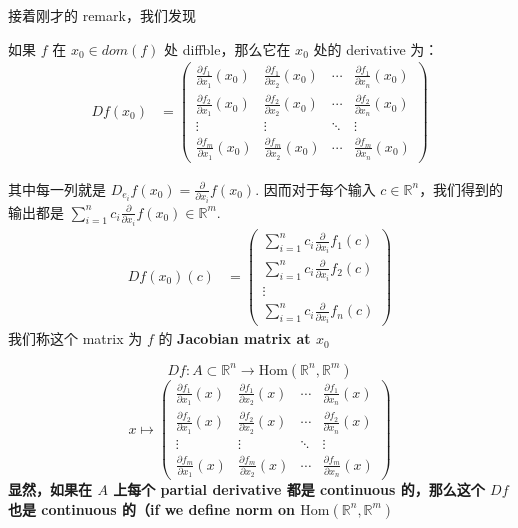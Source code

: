 \documentclass[lang=cn,11pt]{elegantbook}
\begin{document}
接着刚才的 remark，我们发现
\begin{theorem}
    如果 $f $ 在 $x_0 \in dom(f) $ 处 diffble，那么它在 $x_0$ 处的 derivative 为：
    \begin{align}
        Df(x_0) 
        & = \begin{pmatrix}
        \frac{\partial f_1}{\partial x_1} (x_0)& \frac{\partial f_1}{\partial x_2}(x_0) & \cdots & \frac{\partial f_1}{\partial x_n}(x_0) \\
        \frac{\partial f_2}{\partial x_1} (x_0)& \frac{\partial f_2}{\partial x_2}(x_0) & \cdots & \frac{\partial f_2}{\partial x_n}(x_0) \\
        \vdots & \vdots & \ddots & \vdots \\
        \frac{\partial f_m}{\partial x_1}(x_0) & \frac{\partial f_m}{\partial x_2} (x_0)& \cdots & \frac{\partial f_m}{\partial x_n}(x_0)
        \end{pmatrix}
    \end{align}

    其中每一列就是 $D_{e_i} f(x_0) = \frac{\partial}{\partial x_i} f(x_0)$. 因而对于每个输入 $ c \in \mathbb{R}^n$，我们得到的输出都是 $\sum_{i=1}^n c_i \frac{\partial}{\partial x_i} f(x_0) \in \mathbb{R}^m$.\\
    
    \begin{align}
        Df(x_0) (c)
        & = \begin{pmatrix}
        \sum_{i=1}^n c_i \frac{\partial}{\partial x_i} f_1(c) \\
        \sum_{i=1}^n c_i \frac{\partial}{\partial x_i} f_2(c) \\
        \vdots  \\
        \sum_{i=1}^n c_i \frac{\partial}{\partial x_i} f_n(c)
        \end{pmatrix}
    \end{align}
我们称这个 matrix 为 $f$ 的 \textbf{Jacobian matrix at $x_0$}
\end{theorem}

\begin{remark}
    $$
        Df: A \subset \mathbb{R}^n \rightarrow \text{Hom}(\mathbb{R}^n, \mathbb{R}^m) 
    $$
    $$
        x \mapsto 
        \begin{pmatrix}
        \frac{\partial f_1}{\partial x_1} (x)& \frac{\partial f_1}{\partial x_2}(x) & \cdots & \frac{\partial f_1}{\partial x_n}(x) \\
        \frac{\partial f_2}{\partial x_1} (x)& \frac{\partial f_2}{\partial x_2}(x) & \cdots & \frac{\partial f_2}{\partial x_n}(x) \\
        \vdots & \vdots & \ddots & \vdots \\
        \frac{\partial f_m}{\partial x_1}(x) & \frac{\partial f_m}{\partial x_2} (x)& \cdots & \frac{\partial f_m}{\partial x_n}(x)
        \end{pmatrix}
    $$
    \textbf{显然，如果在 $A$ 上每个 partial derivative 都是 continuous 的，那么这个 $Df$ 也是 continuous 的（if we define norm on $\text{Hom}(\mathbb{R}^n, \mathbb{R}^m) $}
\end{remark}
\end{document}
